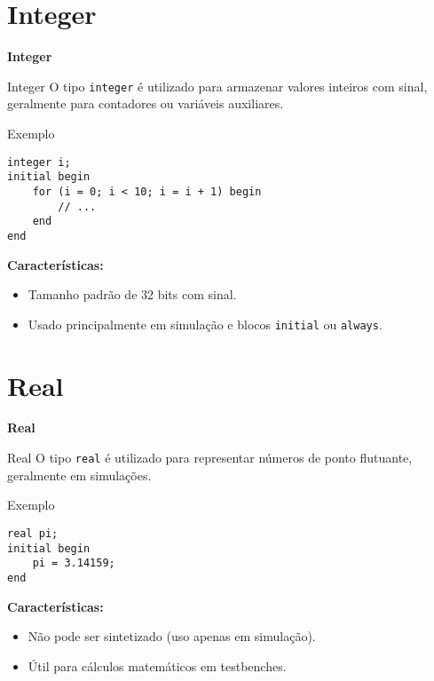 \documentclass[aspectratio=169,xcolor=dvipsnames]{beamer}
\begin{document}
\section{Integer}

\begin{frame}
    \Huge{\centerline{\textbf{Integer}}}
\end{frame}

\begin{frame}[fragile]{Integer}
O tipo \texttt{integer} é utilizado para armazenar valores inteiros com sinal, geralmente para contadores ou variáveis auxiliares.

\begin{block}{Exemplo}
\begin{verbatim}
integer i;
initial begin
    for (i = 0; i < 10; i = i + 1) begin
        // ...
    end
end
\end{verbatim}
\end{block}

\textbf{Características:}
\begin{itemize}
    \item Tamanho padrão de 32 bits com sinal.
    \item Usado principalmente em simulação e blocos \texttt{initial} ou \texttt{always}.
\end{itemize}
\end{frame}

\section{Real}

\begin{frame}
    \Huge{\centerline{\textbf{Real}}}
\end{frame}

\begin{frame}[fragile]{Real}
O tipo \texttt{real} é utilizado para representar números de ponto flutuante, geralmente em simulações.

\begin{block}{Exemplo}
\begin{verbatim}
real pi;
initial begin
    pi = 3.14159;
end
\end{verbatim}
\end{block}

\textbf{Características:}
\begin{itemize}
    \item Não pode ser sintetizado (uso apenas em simulação).
    \item Útil para cálculos matemáticos em testbenches.
\end{itemize}
\end{frame}

\end{document}
